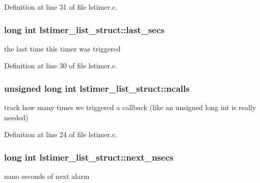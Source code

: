 Definition at line 31 of file lstimer.\-c.

\hypertarget{structlstimer__list__struct_a8f881e66431efbed84b6ad029757bc67}{
\subsubsection[{last\-\_\-secs}]{\setlength{\rightskip}{0pt plus 5cm}long int lstimer\-\_\-list\-\_\-struct\-::last\-\_\-secs}}\label{structlstimer__list__struct_a8f881e66431efbed84b6ad029757bc67}


the last time this timer was triggered 



Definition at line 30 of file lstimer.\-c.

\hypertarget{structlstimer__list__struct_aa56c5b8ce7fa0ae93132cb9908195836}{
\subsubsection[{ncalls}]{\setlength{\rightskip}{0pt plus 5cm}unsigned long int lstimer\-\_\-list\-\_\-struct\-::ncalls}}\label{structlstimer__list__struct_aa56c5b8ce7fa0ae93132cb9908195836}


track how many times we triggered a callback (like an unsigned long int is really needed) 



Definition at line 24 of file lstimer.\-c.

\hypertarget{structlstimer__list__struct_acf993c87ab0ee8ffd74c3907022d6996}{
\subsubsection[{next\-\_\-nsecs}]{\setlength{\rightskip}{0pt plus 5cm}long int lstimer\-\_\-list\-\_\-struct\-::next\-\_\-nsecs}}\label{structlstimer__list__struct_acf993c87ab0ee8ffd74c3907022d6996}


nano seconds of next alarm 



